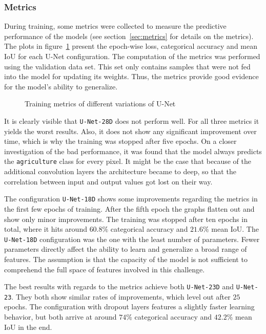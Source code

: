 \subsubsection{Metrics}
During training, some metrics were collected to measure the predictive performance of the models (see section~\ref{sec:metrics} for details on the metrics). The plots in figure~\ref{fig:unet_train_metrics} present the epoch-wise loss, categorical accuracy and mean IoU for each U-Net configuration. The computation of the metrics was performed using the validation data set. This set only contains samples that were not fed into the model for updating its weights. Thus, the metrics provide good evidence for the model's ability to generalize.

\begin{figure}
    \newcommand{\UnetMetricsImageWidth}{0.32\textwidth}
    \centering
            
    \caption{Training metrics of different variations of U-Net}
    \label{fig:unet_train_metrics}
\end{figure}

It is clearly visible that \texttt{U-Net-28D} does not perform well. For all three metrics it yields the worst results. Also, it does not show any significant improvement over time, which is why the training was stopped after five epochs. On a closer investigation of the bad performance, it was found that the model always predicts the \texttt{agriculture} class for every pixel. It might be the case that because of the additional convolution layers the architecture became to deep, so that the correlation between input and output values got lost on their way.

The configuration \texttt{U-Net-18D} shows some improvements regarding the metrics in the first few epochs of training. After the fifth epoch the graphs flatten out and show only minor improvements. The training was stopped after ten epochs in total, where it hits around $60.8\%$ categorical accuracy and $21.6\%$ mean IoU. The \texttt{U-Net-18D} configuration was the one with the least number of parameters. Fewer parameters directly affect the ability to learn and generalize a broad range of features. The assumption is that the capacity of the model is not sufficient to comprehend the full space of features involved in this challenge.

The best results with regards to the metrics achieve both \texttt{U-Net-23D} and \texttt{U-Net-23}. They both show similar rates of improvements, which level out after $25$ epochs. The configuration with dropout layers features a slightly faster learning behavior, but both arrive at around $74\%$ categorical accuracy and $42.2\%$ mean IoU in the end.

